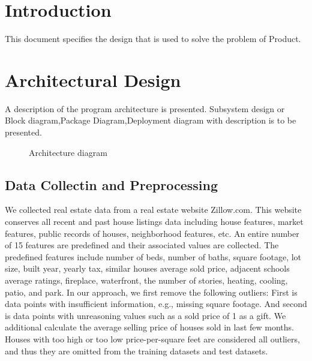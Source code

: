 \documentclass[11pt,fleqn]{book} %
\begin{document}
\section{Introduction}  
This document specifies the design that is used to solve the problem of Product.  
\section{Architectural Design}  
	A description of the program architecture is presented. Subsystem design or Block diagram,Package Diagram,Deployment diagram with description is to be presented.

 
  \begin{center}
	\begin{figure}[!htbp]
		\centering
	  \caption{Architecture diagram}
	  \label{fig:architecture diagram}
	\end{figure}
\end{center} 

\subsection{Data Collectin and Preprocessing}
We collected real estate data from a real estate website Zillow.com. This website conserves all recent and past house listings data including house features, market features, public records of houses, neighborhood features, etc. An entire number of 15 features are predefined and their associated values are collected. The predefined features include number of beds, number of baths, square footage, lot size, built year, yearly tax, similar houses average sold price, adjacent schools average ratings, fireplace, waterfront, the number of stories, heating, cooling, patio, and park. In our approach, we first remove the following outliers:  First is data points with insufficient information, e.g., missing square footage. And second is data points with unreasoning values such as a sold price of 1 as a gift. We additional calculate the average selling price of houses sold in last few months. Houses with too high or too low price-per-square feet are considered all outliers, and thus they are omitted from the training datasets and test datasets.
\end{document}
